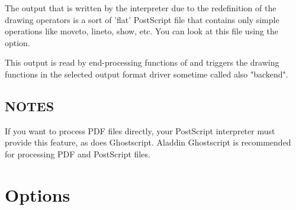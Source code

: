\documentclass[english,a4paper]{article}
\begin{document}
The output that is written by the interpreter due to the redefinition of the
drawing operators is a sort of 'flat' PostScript file that contains only simple
operations like moveto, lineto, show, etc. You can look at this file using the
 option. 

This output is read by end-processing functions of  and triggers
the drawing functions in the selected output format driver sometime called also "backend". 

\subsection{NOTES}

If you want to process PDF files directly, your PostScript interpreter must
provide this feature, as does Ghostscript. Aladdin Ghostscript is
recommended for processing PDF and PostScript files.

\section{Options}
\end{document}
